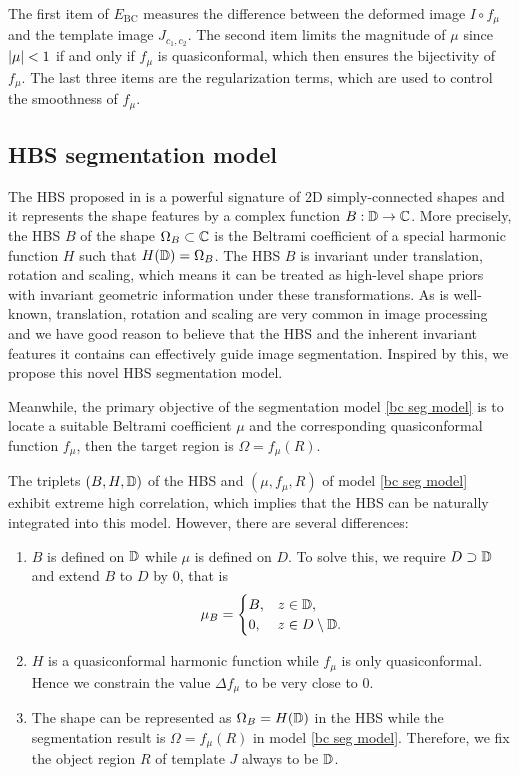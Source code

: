 \documentclass[review,onefignum,onetabnum]{siamonline190516}
\begin{document}
The first item of $E_{\text{BC}}$ measures the difference between the deformed image $I \circ f_\mu$ and the template image $J_{c_1, c_2}$. The second item limits the magnitude of $\mu$ since $\left\vert \mu \right\vert < 1$ if and only if $f_\mu$ is quasiconformal, which then ensures the bijectivity of $f_\mu$. The last three items are the regularization terms, which are used to control the smoothness of $f_\mu$.

\subsection{HBS segmentation model}
The HBS proposed in \cite{} is a powerful signature of 2D simply-connected shapes and  it represents the shape features by a complex function $B: \mathbb{D} \rightarrow \mathbb{C}$. More precisely, the HBS $B$ of the shape $\Omega_B \subset \mathbb{C}$ is the Beltrami coefficient of a special harmonic function $H$ such that $H(\mathbb{D}) = \Omega_B$. The HBS $B$ is invariant under translation, rotation and scaling, which means it can be treated as high-level shape priors with invariant geometric information under these transformations. As is well-known, translation, rotation and scaling are very common in image processing and we have good reason to believe that the HBS and the inherent invariant features it contains can effectively guide image segmentation. Inspired by this, we propose this novel HBS segmentation model.

Meanwhile, the primary objective of the segmentation model \ref{bc seg model} is to locate a suitable Beltrami coefficient $\mu$ and the corresponding quasiconformal function $f_\mu$, then the target region is $\Omega = f_\mu(R)$. 

The triplets $(B, H, \mathbb{D})$ of the HBS and $(\mu, f_\mu, R)$ of model \ref{bc seg model} exhibit extreme high correlation, which implies that the HBS can be naturally integrated into this model. However, there are several differences:
\begin{enumerate}
    \item $B$ is defined on $\mathbb{D}$ while $\mu$ is defined on $D$. To solve this, we require $D \supset \mathbb{D}$ and extend $B$ to $D$ by $0$, that is
          \begin{equation}
              \mu_B = \begin{cases}
                  B, & z \in \mathbb{D},              \\
                  0, & z \in D \setminus \mathbb{D}.
              \end{cases}
          \end{equation}
          
    \item $H$ is a quasiconformal harmonic function while $f_\mu$ is only quasiconformal. Hence we constrain the value $\Delta f_\mu$ to be very close to $0$.
          
    \item The shape can be represented as $\Omega_B = H(\mathbb{D})$ in the HBS while the segmentation result is $\Omega = f_\mu(R)$ in model \ref{bc seg model}. Therefore, we fix the object region $R$ of template $J$ always to be $\mathbb{D}$.
\end{enumerate}
\end{document}
